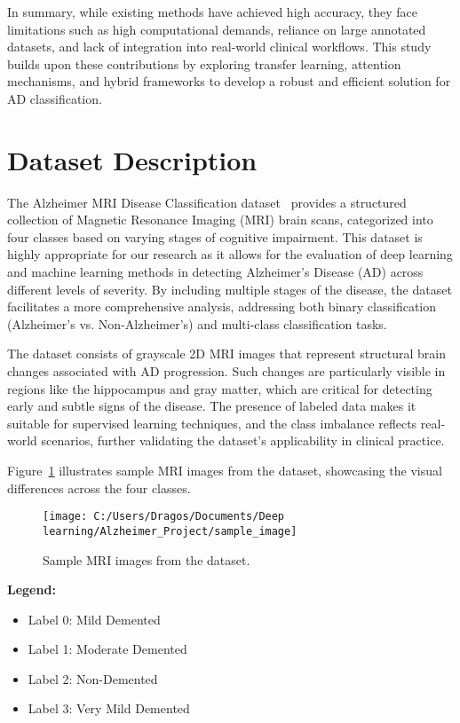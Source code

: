\documentclass[runningheads]{llncs}
\begin{document}
In summary, while existing methods have achieved high accuracy, they face limitations such as high computational demands, reliance on large annotated datasets, and lack of integration into real-world clinical workflows. This study builds upon these contributions by exploring transfer learning, attention mechanisms, and hybrid frameworks to develop a robust and efficient solution for AD classification.

\section{Dataset Description}

The Alzheimer MRI Disease Classification dataset~\cite{dataset_source} provides a structured collection of Magnetic Resonance Imaging (MRI) brain scans, categorized into four classes based on varying stages of cognitive impairment. This dataset is highly appropriate for our research as it allows for the evaluation of deep learning and machine learning methods in detecting Alzheimer's Disease (AD) across different levels of severity. By including multiple stages of the disease, the dataset facilitates a more comprehensive analysis, addressing both binary classification (Alzheimer's vs. Non-Alzheimer's) and multi-class classification tasks.

The dataset consists of grayscale 2D MRI images that represent structural brain changes associated with AD progression. Such changes are particularly visible in regions like the hippocampus and gray matter, which are critical for detecting early and subtle signs of the disease. The presence of labeled data makes it suitable for supervised learning techniques, and the class imbalance reflects real-world scenarios, further validating the dataset's applicability in clinical practice.

Figure~\ref{fig:sample_images} illustrates sample MRI images from the dataset, showcasing the visual differences across the four classes.

\begin{figure}[htbp]
    \centering
    \texttt{[image: C:/Users/Dragos/Documents/Deep learning/Alzheimer\_Project/sample\_image]}
    \caption{Sample MRI images from the dataset.}
    \label{fig:sample_images}
\end{figure}

\noindent
\textbf{Legend:}
\begin{itemize}
    \item Label 0: Mild Demented
    \item Label 1: Moderate Demented
    \item Label 2: Non-Demented
    \item Label 3: Very Mild Demented
\end{itemize}
\end{document}
